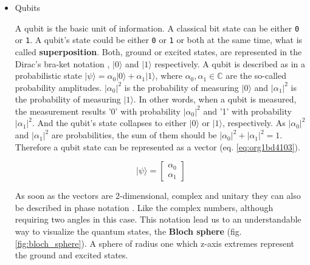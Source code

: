 \begin{itemize}
\item Qubits
\label{sec:org45a963a}


A qubit is the basic unit of information.
A classical bit state can be either \texttt{0} or \texttt{1}.
A qubit's state could be either \texttt{0} or \texttt{1} or both at the same time, what is called \textbf{superposition}.
Both, ground or excited states, are represented in the Dirac's bra-ket notation \cite{Nielsen_2009}, \(| 0 \rangle\) and \(| 1 \rangle\) respectively.
A qubit is described as in a probabilistic state \(| \psi \rangle = \alpha_0 | 0 \rangle + \alpha_1 | 1 \rangle\), where \(\alpha_0, \alpha_1 \in \mathbb{C}\) are the so-called probability amplitudes.
\(|\alpha_0|^2\) is the probability of measuring \(| 0 \rangle\) and \(|\alpha_1|^2\) is the probability of measuring \(| 1 \rangle\).
In other words, when a qubit is measured, the measurement results '0' with probability \(|\alpha_0|^2\) and '1' with probability \(|\alpha_1|^2\).
And the qubit's state collapses to either \(| 0 \rangle\) or \(| 1 \rangle\), respectively.
As \(|\alpha_0|^2\) and \(|\alpha_1|^2\)  are probabilities, the sum of them should be \(|\alpha_0|^2 + |\alpha_1|^2 = 1\).
Therefore a qubit state can be represented as a vector (eq. \ref{eq:org1bd4103}).

\begin{equation}
\label{eq:org1bd4103}
|\psi\rangle = \begin{bmatrix}\alpha_0 \\ \alpha_1 \end{bmatrix}
\end{equation}

As soon as the vectors are 2-dimensional, complex and unitary they can also be described in phase notation \cite{Nielsen_2009}.
Like the complex numbers, although requiring two angles in this case.
This notation lead us to an understandable way to visualize the quantum states, the \textbf{Bloch sphere} (fig. \ref{fig:bloch_sphere}).
A sphere of radius one which z-axis extremes represent the ground and excited states.


\end{itemize}
